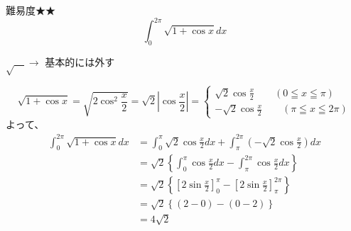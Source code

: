 \documentclass[main]{subfiles}
\begin{document}

\begin{mondai}{難易度★★}{}
    $$\int ^{2\pi}_0 \sqrt{1+\cos x} dx$$
    
    \tcblower
    
    \begin{pointbox}
        \begin{center}
        $\sqrt{\quad}\rightarrow$  基本的には外す
        \end{center}
    \end{pointbox}

    \begin{equation*}
        \sqrt{1+\cos x} = \sqrt{2\cos ^2 \frac{x}{2}} = \sqrt{2}\left| \cos \frac{x}{2} \right| = 
      \begin{cases}
        \sqrt{2} \cos \frac{x}{2} \qquad (0\leqq x \leqq \pi)\\
        -\sqrt{2} \cos \frac{x}{2} \qquad (\pi\leqq x \leqq 2\pi)
      \end{cases}
    \end{equation*}
    よって、
    \begin{align*}
        \int ^{2\pi}_0 \sqrt{1+\cos x} dx
            &= \int^\pi_0 \sqrt{2} \cos \frac{x}{2}dx + \int^{2\pi}_\pi \left(-\sqrt{2} \cos \frac{x}{2}\right)dx \\
            &= \sqrt{2} \left\{\int^\pi_0 \cos \frac{x}{2}dx - \int^{2\pi}_\pi \cos \frac{x}{2}dx \right\} \\
            &= \sqrt{2} \left\{ \left[ 2\sin \frac{x}{2} \right]^\pi_0 - \left[ 2\sin \frac{x}{2} \right]^{2\pi}_\pi \right\} \\
            &= \sqrt{2} \left\{ (2-0) - (0-2) \right\} \\
            &= 4 \sqrt{2} \tag{答}
    \end{align*}
    \begin{figure}[H]
    \centering
\end{figure}
\end{mondai}
\end{document}
